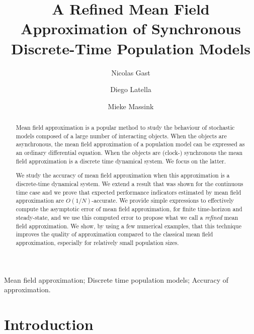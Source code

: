 \documentclass{elsarticle}
\begin{document}
\begin{frontmatter}

  \title{A Refined Mean Field Approximation of Synchronous
    Discrete-Time Population Models}

\author[INRIA]{Nicolas Gast}

\author[CNR]{Diego Latella}
\author[CNR]{Mieke Massink}

\address[INRIA]{Inria, Univ. Grenoble Alpes, F-38000 Grenoble, France}
\address[CNR]{CNR-ISTI, I-56124 Pisa, Italy}

\begin{abstract}
  Mean field approximation is a popular method to study the behaviour
  of stochastic models composed of a large number of interacting
  objects. When the objects are asynchronous, the mean field
  approximation of a population model can be expressed as an ordinary
  differential equation. When the objects are (clock-) synchronous the
  mean field approximation is a discrete time dynamical system. We
  focus on the latter.

  We study the accuracy of mean field approximation when this
  approximation is a discrete-time dynamical system. We extend a
  result that was shown for the continuous time case and we prove that
  expected performance indicators estimated by mean field approximation
  are $O(1/N)$-accurate. We provide simple expressions to effectively
  compute the asymptotic error of mean field approximation, for finite
  time-horizon and steady-state, and we use this computed error to
  propose what we call a \emph{refined} mean field approximation. We
  show, by using a few numerical examples, that this technique
  improves the quality of approximation compared to the classical mean
  field approximation, especially for relatively small population sizes.
\end{abstract}

\begin{keyword}
  Mean field approximation; Discrete time population models; Accuracy
  of approximation.
\end{keyword}

\end{frontmatter}


\section{Introduction}
\label{sect:introduction}
\end{document}
